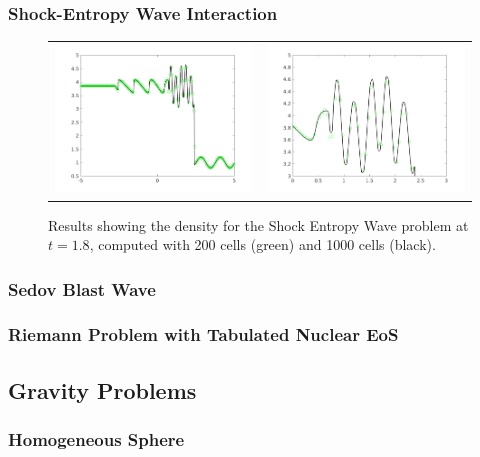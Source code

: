 \documentclass[10pt,preprint]{aastex}
\begin{document}
\subsubsection{Shock-Entropy Wave Interaction}

\begin{figure}[h]
  \begin{center}
	\begin{tabular}{cc}
      \includegraphics[width=.475\textwidth]{den.png} &
	  \includegraphics[width=.475\textwidth]{denzoom.png}
	\end{tabular}
  \end{center}
  \caption{Results showing the density for the Shock Entropy Wave problem at $t=1.8$, computed with 200 cells (green) and 1000 cells (black).}
  \label{fig:shock}
\end{figure}

\subsubsection{Sedov Blast Wave}

\subsubsection{Riemann Problem with Tabulated Nuclear EoS}

\subsection{Gravity Problems}

\subsubsection{Homogeneous Sphere}
\end{document}
